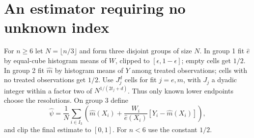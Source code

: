 \documentclass[11pt]{article}
\theoremstyle{remark}
\begin{document}
\section{An estimator requiring no unknown index}
For $n\geq6$ let $N=\lfloor n/3\rfloor$ and form three disjoint groups
of size $N$. In group 1 fit $\widehat e$ by equal-cube histogram means
of $W$, clipped to $[\epsilon,1-\epsilon]$; empty cells get $1/2$.
In group 2 fit $\widehat m$ by histogram means of $Y$ among treated
observations; cells with no treated observations get $1/2$.
Use $J_j^d$ cells for fit $j=e,m$, with $J_j$ a dyadic integer within
a factor two of $N^{1/(2t_j+d)}$. Thus only known lower endpoints choose
the resolutions. On group 3 define
\[
 \widehat\psi=\frac1N\sum_{i\in I_3}
 \left(\widehat m(X_i)+
 \frac{W_i}{\widehat e(X_i)}[Y_i-\widehat m(X_i)]\right),
\]
and clip the final estimate to $[0,1]$. For $n<6$ use the constant $1/2$.
\end{document}
